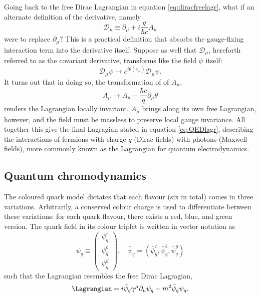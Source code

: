 Going back to the free Dirac Lagrangian in equation \ref{eq:diracfreelagr}, what if an alternate definition of the derivative, namely 
\begin{equation}
    \mathcal{D}_{\mu}\equiv \partial_{\mu}+i\dfrac{q}{\hbar c}A_{\mu}
\end{equation}
were to replace $\partial_{\mu}$? This is a practical definition that absorbs the gauge-fixing interaction term into the derivative itself. Suppose as well that $\mathcal{D}_{\mu}$, hereforth referred to as the covariant derivative, transforms like the field $\psi$ itself:
\begin{equation}
    \mathcal{D}_{\mu}\psi\rightarrow e^{i\theta(x_{\mu})}\mathcal{D}_{\mu}\psi .
\end{equation}
It turns out that in doing so, the transformation of of $A_{\mu}$, 
\begin{equation}
    A_{\mu}\rightarrow A_{\mu}-\dfrac{\hbar c}{q}\partial_{\mu}\theta
\end{equation}
renders the Lagrangian locally invariant. $A_{\mu}$ brings along its own free Lagrangian, however, and the field must be massless to preserve local gauge invariance. All together this give the final Lagragian stated in equation \ref{eq:QEDlagr}, describing the interactions of fermions with charge $q$ (Dirac fields) with photons (Maxwell fields), more commonly known as the Lagrangian for quantum electrodynamics. 

\subsection{Quantum chromodynamics}

The coloured quark model dictates that each flavour (six in total) comes in three variations. Arbitrarily, a conserved colour charge is used to differentiate between these variations: for each quark flavour, there exists a red, blue, and green version. The quark field in its colour triplet is written in vector notation as
\begin{equation}
\psi_q\equiv
    \begin{pmatrix} 
        \psi_q^r\\ 
        \psi_q^b\\
        \psi_q^g
    \end{pmatrix}
,\quad
\bar{\psi}_q=(\bar{\psi}_q^r,\bar{\psi}_q^b,\bar{\psi}_q^g)
\end{equation}
such that the Lagrangian resembles the free Dirac Lagragian,
\begin{equation} \label{eq:QCDfreelagr}
    \Lagrangian=i\bar{\psi}_q\gamma^{\mu}\partial_{\mu}\psi_q-m^2\bar{\psi}_q \psi_q.
\end{equation}

